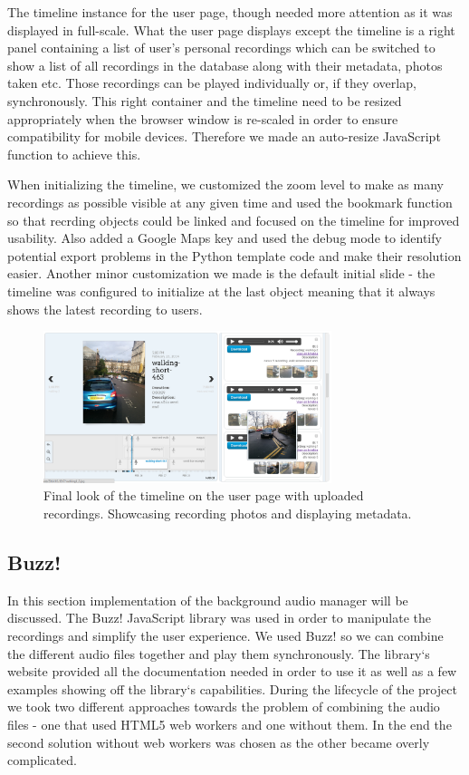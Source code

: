 \documentclass{l3proj}
\begin{document}
The timeline instance for the user page, though needed more attention as it was displayed in full-scale. What the user page displays except the timeline is a right panel containing a list of user's personal recordings which can be switched to show a list of all recordings in the database along with their metadata, photos taken etc.
Those recordings can be played individually or, if they overlap, synchronously. This right container and the timeline need to be resized appropriately when the browser window is re-scaled in order to ensure compatibility for mobile devices.
Therefore we made an auto-resize JavaScript function to achieve this.

When initializing the timeline, we customized the zoom level to make as many recordings as possible visible at any given time and used the bookmark function so that recrding objects could be linked and focused on the timeline for improved usability.
Also added a Google Maps key and used the debug mode to identify potential export problems in the \gls{Python} template code and make their resolution easier. Another minor customization we made is the default initial slide - the timeline was configured to initialize at the last object meaning that it always shows the latest recording to users.

\begin{figure}[ht!]
  \centering
\includegraphics[width=0.75\textwidth]{images/timeline_final.png}
\caption{Final look of the timeline on the user page with uploaded recordings. Showcasing recording photos and displaying metadata.}
\end{figure}

\subsection{Buzz!}
In this section implementation of the background audio manager will be discussed. The Buzz! \gls{JavaScript} library was used in order to manipulate the recordings and simplify the user experience. We used Buzz! so we can combine the different audio files together and play them synchronously. The library`s website provided all the documentation needed in order to use it as well as a few examples showing off the library`s capabilities. During the lifecycle of the project we took two different approaches towards the problem of combining the audio files - one that used HTML5 web workers and one without them. In the end the second solution without web workers was chosen as the other became overly complicated.
\end{document}
